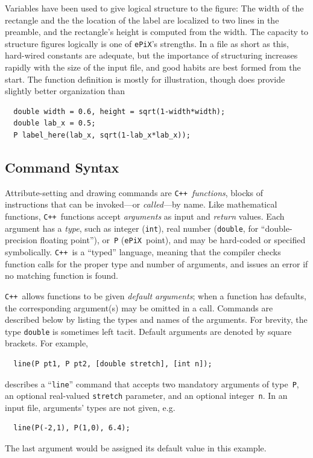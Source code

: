 \documentclass[12pt]{report}
\newcommand{\code}[1]{\texttt{#1}}
\newcommand{\ePiX}{\code{ePiX}}
\newcommand{\CXX}{\code{C++}}
\begin{document}
Variables have been used to give logical structure to the figure: The
width of the rectangle and the the location of the label are localized
to two lines in the preamble, and the rectangle's height is computed
from the width.  The capacity to structure figures logically is one of
\ePiX's strengths. In a file as short as this, hard-wired constants
are adequate, but the importance of structuring increases rapidly with
the size of the input file, and good habits are best formed from the
start. The function definition is mostly for illustration, though does
provide slightly better organization than

\begin{footnotesize}
\begin{verbatim}
  double width = 0.6, height = sqrt(1-width*width);
  double lab_x = 0.5;
  P label_here(lab_x, sqrt(1-lab_x*lab_x));
\end{verbatim}
\end{footnotesize}


\subsection*{Command Syntax}

Attribute-setting and drawing commands are \CXX\ \emph{functions},
blocks of instructions that can be invoked---or \emph{called}---by
name. Like mathematical functions, \CXX\ functions accept
\emph{arguments} as input and \emph{return} values.  Each argument has
a \emph{type}, such as integer (\code{int}), real number
(\code{double}, for ``double-precision floating point''), or~\code{P}
(\ePiX\ point), and may be hard-coded or specified symbolically. \CXX\ 
is a ``typed'' language, meaning that the compiler checks function
calls for the proper type and number of arguments, and issues an error
if no matching function is found.

\CXX\ allows functions to be given \emph{default
  arguments}; when a function has defaults,
  the corresponding argument(s) may be omitted in a call. Commands are
  described below by listing the types and names of the arguments. For
  brevity, the type \code{double} is sometimes left tacit.  Default
  arguments are denoted by square brackets. For example,
\begin{verbatim}
  line(P pt1, P pt2, [double stretch], [int n]);
\end{verbatim}
describes a ``\code{line}'' command that accepts two mandatory
arguments of type~\code{P}, an optional real-valued \code{stretch}
parameter, and an optional integer~\code{n}. In an input file,
arguments' types are not given, e.g.
\begin{verbatim}
  line(P(-2,1), P(1,0), 6.4);
\end{verbatim}
The last argument would be assigned its default value in this example.
\end{document}
